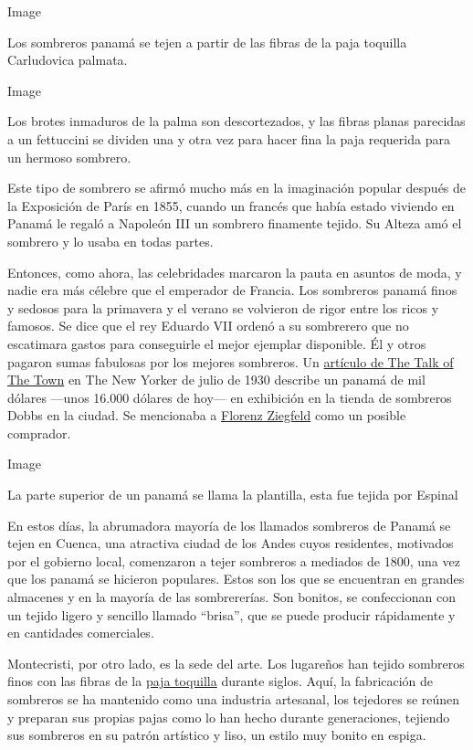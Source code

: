 Image

Los sombreros panamá se tejen a partir de las fibras de la paja
toquilla~ Carludovica palmata.

Image

Los brotes inmaduros de la palma son descortezados, y las fibras planas
parecidas a un fettuccini se dividen una y otra vez para hacer fina la
paja requerida para un hermoso sombrero.

Este tipo de sombrero se afirmó mucho más en la imaginación popular
después de la Exposición de París en 1855, cuando un francés que había
estado viviendo en Panamá le regaló a Napoleón III un sombrero finamente
tejido. Su Alteza amó el sombrero y lo usaba en todas partes.

Entonces, como ahora, las celebridades marcaron la pauta en asuntos de
moda, y nadie era más célebre que el emperador de Francia. Los sombreros
panamá finos y sedosos para la primavera y el verano se volvieron de
rigor entre los ricos y famosos. Se dice que el rey Eduardo VII ordenó a
su sombrerero que no escatimara gastos para conseguirle el mejor
ejemplar disponible. Él y otros pagaron sumas fabulosas por los mejores
sombreros. Un
\href{https://www.newyorker.com/magazine/1930/07/05/thousand-dollar-hats}{artículo
de The Talk of The Town} en The New Yorker de julio de 1930 describe un
panamá de mil dólares ---unos 16.000 dólares de hoy--- en exhibición en
la tienda de sombreros Dobbs en la ciudad. Se mencionaba a
\href{https://www.pbs.org/wnet/broadway/stars/florenz-ziegfeld/}{Florenz
Ziegfeld} como un posible comprador.

Image

La parte superior de un panamá se llama la plantilla, esta fue tejida
por Espinal

En estos días, la abrumadora mayoría de los llamados sombreros de Panamá
se tejen en Cuenca, una atractiva ciudad de los Andes cuyos residentes,
motivados por el gobierno local, comenzaron a tejer sombreros a mediados
de 1800, una vez que los panamá se hicieron populares. Estos son los que
se encuentran en grandes almacenes y en la mayoría de las sombrererías.
Son bonitos, se confeccionan con un tejido ligero y sencillo llamado
``brisa'', que se puede producir rápidamente y en cantidades
comerciales.

Montecristi, por otro lado, es la sede del arte. Los lugareños han
tejido sombreros finos con las fibras de la
\href{https://timesmachine.nytimes3xbfgragh.onion/timesmachine/1900/09/02/101066082.html?pageNumber=24}{paja
toquilla} durante siglos. Aquí, la fabricación de sombreros se ha
mantenido como una industria artesanal, los tejedores se reúnen y
preparan sus propias pajas como lo han hecho durante generaciones,
tejiendo sus sombreros en su patrón artístico y liso, un estilo muy
bonito en espiga.


